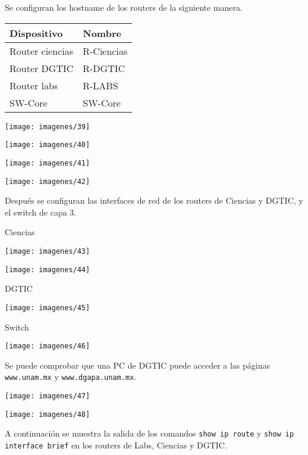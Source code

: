 \documentclass{article}
\begin{document}
Se configuran los hostname de los routers de la siguiente manera.

\begin{center}
\begin{tabular}{|l|l|}
\hline
\textbf{Dispositivo} & \textbf{Nombre} \\ \hline
Router ciencias & R-Ciencias \\ \hline
Router DGTIC & R-DGTIC \\ \hline
Router labs & R-LABS \\ \hline
SW-Core & SW-Core \\ \hline
\end{tabular}
\end{center}

\begin{center}
\texttt{[image: imagenes/39]}

\texttt{[image: imagenes/40]}

\texttt{[image: imagenes/41]}

\texttt{[image: imagenes/42]}
\end{center}

Después se configuran las interfaces de red de los routers de Ciencias y DGTIC, y el switch de capa 3.

\begin{center}
Ciencias

\texttt{[image: imagenes/43]}

\texttt{[image: imagenes/44]}
\end{center}

\begin{center}
DGTIC

\texttt{[image: imagenes/45]}
\end{center}

\begin{center}
Switch

\texttt{[image: imagenes/46]}
\end{center}

Se puede comprobar que una PC de DGTIC puede acceder a las páginas \texttt{www.unam.mx} y \texttt{www.dgapa.unam.mx}.

\begin{center}
\texttt{[image: imagenes/47]}

\texttt{[image: imagenes/48]}
\end{center}

A continuación se muestra la salida de los comandos \texttt{show ip route} y \texttt{show ip interface brief} en los routers de Labs, Ciencias y DGTIC.
\end{document}
